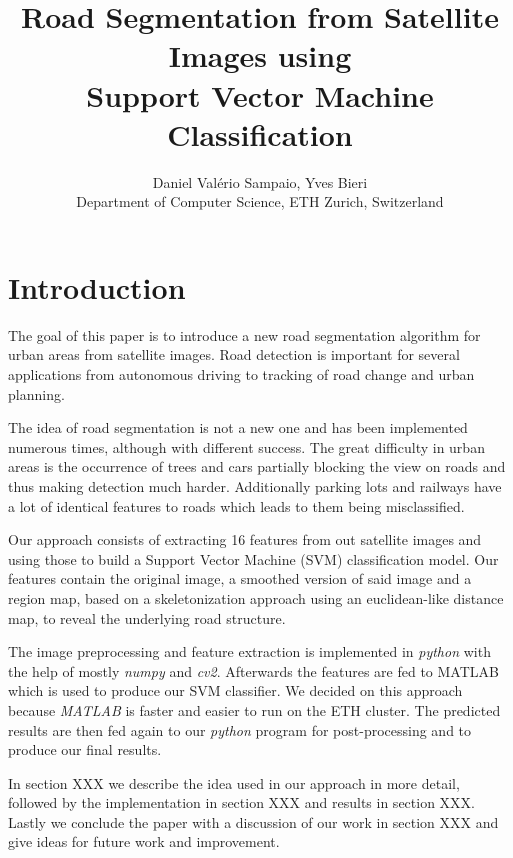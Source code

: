 \documentclass[10pt,conference,compsocconf]{IEEEtran}
\begin{document}
\title{Road Segmentation from Satellite Images using\\Support Vector Machine Classification}

\author{
  Daniel Val\'erio Sampaio, Yves Bieri\\
  Department of Computer Science, ETH Zurich, Switzerland
}

\maketitle

\begin{abstract}
	
\end{abstract}

\section{Introduction}

The goal of this paper is to introduce a new road segmentation algorithm for urban areas from satellite images. Road detection is important for several applications from autonomous driving to tracking
of road change and urban planning.

The idea of road segmentation is not a new one and has been implemented numerous times, although with
different success. The great difficulty in urban areas is the occurrence of trees and cars partially blocking the view on roads and thus making detection much harder. Additionally parking lots and railways have a lot of identical features to roads which leads to them being misclassified.

Our approach consists of extracting 16 features from out satellite images and using those to build a Support Vector Machine (SVM) classification model. Our features contain the original image, a smoothed version of said image and a region map, based on a skeletonization approach using an euclidean-like distance map, to reveal the underlying road structure.

The image preprocessing and feature extraction is implemented in \emph{python} with the help of mostly \emph{numpy} and \emph{cv2}. Afterwards the features are fed to MATLAB which is used to produce our SVM classifier. We decided on this approach because \emph{MATLAB} is faster and easier to run on the ETH cluster. The predicted results are then fed again to our \emph{python} program for post-processing and to produce our final results.

In section XXX we describe the idea used in our approach in more detail,
followed by the implementation in section XXX and results in section XXX.
Lastly we conclude the paper with a discussion of our work in section XXX and 
give ideas for future work and improvement.
\end{document}
